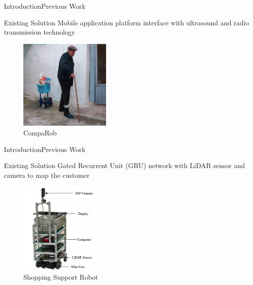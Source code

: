 \documentclass{beamer}
\begin{document}

\begin{frame}{Introduction}{Previous Work}
  \begin{block}{Existing Solution}
        Mobile application platform interface with ultrasound and radio transmission technology~\cite{Sales2016-CompaRob}
  \end{block}
    \begin{figure}[b]
        \centering
        \includegraphics[width=0.4\textwidth]{figs/img/CompaRob}
        \caption{CompaRob}
    \end{figure}
\end{frame}


\begin{frame}{Introduction}{Previous Work}
  \begin{block}{Existing Solution}
        Gated Recurrent Unit (GRU) network with LiDAR sensor and camera to map the customer~\cite{islam_lam_fukuda_kobayashi_kuno_2019}
  \end{block}
    \begin{figure}[b]
        \centering
        \includegraphics[width=0.38\textwidth]{figs/img/ShoppingSuportRobot}
        \caption{Shopping Support Robot}
    \end{figure}
\end{frame}
\end{document}
